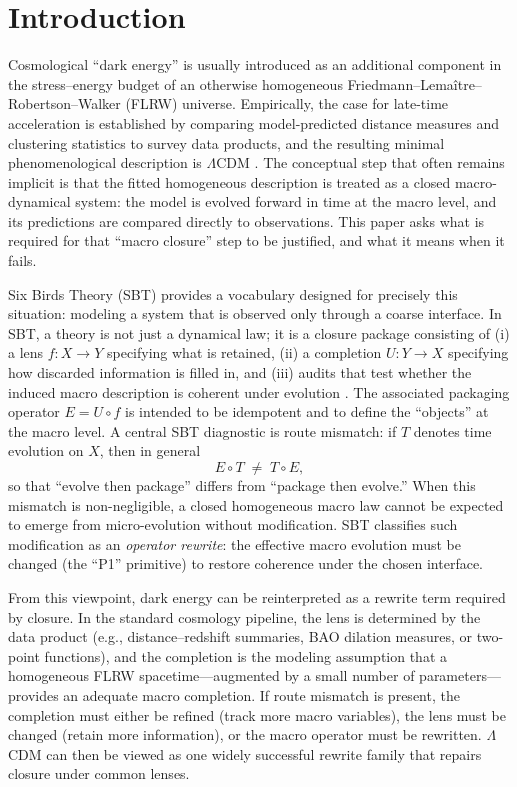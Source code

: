 \documentclass[11pt]{article}
\newcommand{\StateSpace}{X}
\newcommand{\ObsSpace}{Y}
\newcommand{\Lens}{f}              \newcommand{\Completion}{U}        \newcommand{\PackageOp}{E}
\theoremstyle{definition}
\theoremstyle{plain}
\theoremstyle{remark}
\begin{document}
\section{Introduction}\label{sec:intro}
Cosmological ``dark energy'' is usually introduced as an additional component in the stress--energy budget of an otherwise homogeneous Friedmann--Lema\^{i}tre--Robertson--Walker (FLRW) universe. Empirically, the case for late-time acceleration is established by comparing model-predicted distance measures and clustering statistics to survey data products, and the resulting minimal phenomenological description is $\Lambda$CDM \cite{Riess1998SN,Perlmutter1999SN,Weinberg2013Acceleration}. The conceptual step that often remains implicit is that the fitted homogeneous description is treated as a closed macro-dynamical system: the model is evolved forward in time at the macro level, and its predictions are compared directly to observations. This paper asks what is required for that ``macro closure'' step to be justified, and what it means when it fails.

Six Birds Theory (SBT) provides a vocabulary designed for precisely this situation: modeling a system that is observed only through a coarse interface. In SBT, a theory is not just a dynamical law; it is a closure package consisting of (i) a lens $\Lens:\StateSpace\to\ObsSpace$ specifying what is retained, (ii) a completion $\Completion:\ObsSpace\to\StateSpace$ specifying how discarded information is filled in, and (iii) audits that test whether the induced macro description is coherent under evolution \cite{Tsiokos2026SixBirds,Tsiokos2026WakeStone}. The associated packaging operator $\PackageOp= \Completion\circ \Lens$ is intended to be idempotent and to define the ``objects'' at the macro level. A central SBT diagnostic is route mismatch: if $T$ denotes time evolution on $\StateSpace$, then in general
\begin{equation}
\PackageOp\circ T \;\neq\; T\circ \PackageOp,
\label{eq:route_mismatch_intro}
\end{equation}
so that ``evolve then package'' differs from ``package then evolve.'' When this mismatch is non-negligible, a closed homogeneous macro law cannot be expected to emerge from micro-evolution without modification. SBT classifies such modification as an \emph{operator rewrite}: the effective macro evolution must be changed (the ``P1'' primitive) to restore coherence under the chosen interface.

From this viewpoint, dark energy can be reinterpreted as a rewrite term required by closure. In the standard cosmology pipeline, the lens is determined by the data product (e.g., distance--redshift summaries, BAO dilation measures, or two-point functions), and the completion is the modeling assumption that a homogeneous FLRW spacetime---augmented by a small number of parameters---provides an adequate macro completion. If route mismatch is present, the completion must either be refined (track more macro variables), the lens must be changed (retain more information), or the macro operator must be rewritten. $\Lambda$CDM can then be viewed as one widely successful rewrite family that repairs closure under common lenses.
\end{document}
